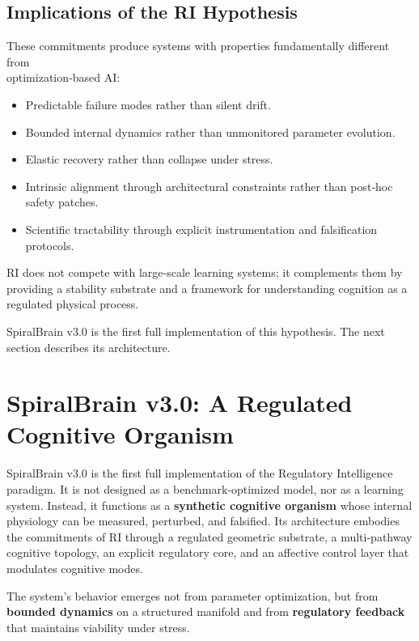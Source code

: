 \documentclass[12pt,a4paper]{report}
\begin{document}
\subsection{Implications of the RI Hypothesis}

These commitments produce systems with properties fundamentally different from \\
optimization‑based AI:

\begin{itemize}
\item Predictable failure modes rather than silent drift.  
\item Bounded internal dynamics rather than unmonitored parameter evolution.  
\item Elastic recovery rather than collapse under stress.  
\item Intrinsic alignment through architectural constraints rather than post‑hoc safety patches.  
\item Scientific tractability through explicit instrumentation and falsification protocols.  
\end{itemize}

RI does not compete with large‑scale learning systems; it complements them by providing a stability substrate and a framework for understanding cognition as a regulated physical process.

SpiralBrain v3.0 \cite{SpiralBrainV3} is the first full implementation of this hypothesis. The next section describes its architecture.

\section{SpiralBrain v3.0: A Regulated Cognitive Organism}

SpiralBrain v3.0 \cite{SpiralBrainV3} is the first full implementation of the Regulatory Intelligence paradigm. It is not designed as a benchmark‑optimized model, nor as a learning system. Instead, it functions as a \textbf{synthetic cognitive organism} whose internal physiology can be measured, perturbed, and falsified. Its architecture embodies the commitments of RI through a regulated geometric substrate, a multi‑pathway cognitive topology, an explicit regulatory core, and an affective control layer that modulates cognitive modes.

The system’s behavior emerges not from parameter optimization, but from \textbf{bounded dynamics} on a structured manifold and from \textbf{regulatory feedback} that maintains viability under stress.
\end{document}
